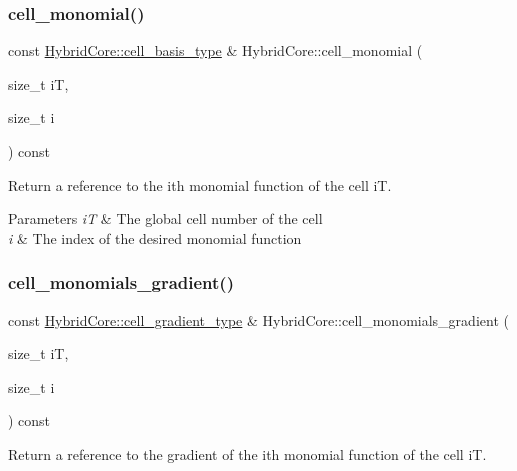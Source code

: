 \subsubsection{\texorpdfstring{cell\+\_\+monomial()}{cell\_monomial()}}
{\footnotesize\ttfamily const \hyperlink{classHArDCore2D_1_1HybridCore_a4b9c53f6ec13dc9e73f5cdc5c8ae782b}{Hybrid\+Core\+::cell\+\_\+basis\+\_\+type} \& Hybrid\+Core\+::cell\+\_\+monomial (\begin{DoxyParamCaption}\item[{size\+\_\+t}]{iT,  }\item[{size\+\_\+t}]{i }\end{DoxyParamCaption}) const}



Return a reference to the i\textquotesingle{}th monomial function of the cell iT. 


\begin{DoxyParams}{Parameters}
{\em iT} & The global cell number of the cell \\
\hline
{\em i} & The index of the desired monomial function \\
\hline
\end{DoxyParams}
\mbox{\label{classHArDCore2D_1_1HybridCore_a0edb2fb02577f68744abb8a436381cf7}} 
\subsubsection{\texorpdfstring{cell\+\_\+monomials\+\_\+gradient()}{cell\_monomials\_gradient()}}
{\footnotesize\ttfamily const \hyperlink{classHArDCore2D_1_1HybridCore_a41350d7c3ac5a5a5e932348d2c9d0750}{Hybrid\+Core\+::cell\+\_\+gradient\+\_\+type} \& Hybrid\+Core\+::cell\+\_\+monomials\+\_\+gradient (\begin{DoxyParamCaption}\item[{size\+\_\+t}]{iT,  }\item[{size\+\_\+t}]{i }\end{DoxyParamCaption}) const}



Return a reference to the gradient of the i\textquotesingle{}th monomial function of the cell iT. 

